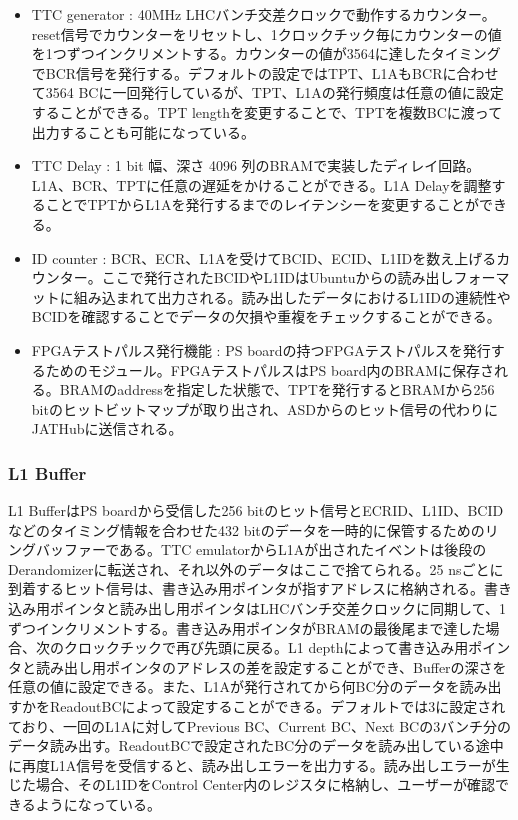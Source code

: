 \begin{itemize}
    \item {TTC generator : } 40MHz LHCバンチ交差クロックで動作するカウンター。reset信号でカウンターをリセットし、1クロックチック毎にカウンターの値を1つずつインクリメントする。カウンターの値が3564に達したタイミングでBCR信号を発行する。デフォルトの設定ではTPT、L1AもBCRに合わせて3564 BCに一回発行しているが、TPT、L1Aの発行頻度は任意の値に設定することができる。TPT lengthを変更することで、TPTを複数BCに渡って出力することも可能になっている。
    \baselineskip

    \item{TTC Delay : }1 bit 幅、深さ 4096 列のBRAMで実装したディレイ回路。L1A、BCR、TPTに任意の遅延をかけることができる。L1A Delayを調整することでTPTからL1Aを発行するまでのレイテンシーを変更することができる。
    \baselineskip

    \item{ID counter : }BCR、ECR、L1Aを受けてBCID、ECID、L1IDを数え上げるカウンター。ここで発行されたBCIDやL1IDはUbuntuからの読み出しフォーマットに組み込まれて出力される。読み出したデータにおけるL1IDの連続性やBCIDを確認することでデータの欠損や重複をチェックすることができる。
    \baselineskip
    
    \item{FPGAテストパルス発行機能 : }PS boardの持つFPGAテストパルスを発行するためのモジュール。FPGAテストパルスはPS board内のBRAMに保存される。BRAMのaddressを指定した状態で、TPTを発行するとBRAMから256 bitのヒットビットマップが取り出され、ASDからのヒット信号の代わりにJATHubに送信される。
    \baselineskip
\end{itemize}

\subsubsection{L1 Buffer} 
\baselineskip
L1 BufferはPS boardから受信した256 bitのヒット信号とECRID、L1ID、BCIDなどのタイミング情報を合わせた432 bitのデータを一時的に保管するためのリングバッファーである。TTC emulatorからL1Aが出されたイベントは後段のDerandomizerに転送され、それ以外のデータはここで捨てられる。25 nsごとに到着するヒット信号は、書き込み用ポインタが指すアドレスに格納される。書き込み用ポインタと読み出し用ポインタはLHCバンチ交差クロックに同期して、1ずつインクリメントする。書き込み用ポインタがBRAMの最後尾まで達した場合、次のクロックチックで再び先頭に戻る。L1 depthによって書き込み用ポインタと読み出し用ポインタのアドレスの差を設定することができ、Bufferの深さを任意の値に設定できる。また、L1Aが発行されてから何BC分のデータを読み出すかをReadoutBCによって設定することができる。デフォルトでは3に設定されており、一回のL1Aに対してPrevious BC、Current BC、Next BCの3バンチ分のデータ読み出す。ReadoutBCで設定されたBC分のデータを読み出している途中に再度L1A信号を受信すると、読み出しエラーを出力する。読み出しエラーが生じた場合、そのL1IDをControl Center内のレジスタに格納し、ユーザーが確認できるようになっている。

